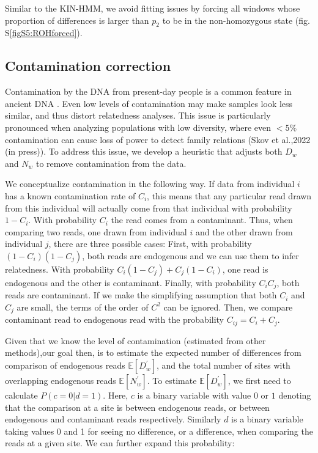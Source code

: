 \documentclass[12pt, letterpaper]{article}
\begin{document}
Similar to the KIN-HMM, we avoid fitting issues by forcing all windows whose proportion of differences is larger than $p_2$ to be in the non-homozygous state (fig. S\ref{figS5:ROHforced}).

\subsection{Contamination correction}\label{contam}
Contamination by the DNA from present-day people is a common feature in ancient DNA \cite{peyregne_present-day_2020}. Even low levels of contamination may make samples look less similar, and thus distort relatedness analyses. This issue is particularly pronounced  when analyzing populations with low diversity, where even $<5\%$ contamination can cause loss of power to detect family relations (Skov et al.,2022 (in press)). To address this issue, we develop a heuristic that adjusts both $D_w$ and $N_w$ to remove contamination from the data.

We conceptualize contamination in the following way. If data from individual $i$ has a known contamination rate of $C_i$, this means that any particular read drawn from this individual will actually come from that individual with probability $1-C_i$. With probability $C_i$ the read comes from a contaminant. Thus, when comparing two reads, one drawn from individual $i$ and the other drawn from individual $j$, there are three possible cases: First, with probability $(1-C_i)(1-C_j)$, both reads are endogenous and we can use them to infer relatedness. With probability $C_i(1-C_j) + C_j(1-C_i)$, one read is endogenous and the other is contaminant. Finally, with probability $C_iC_j$, both reads are contaminant. If we make the simplifying assumption that both $C_i$ and $C_j$ are small, the terms of the order of $C^2$ can be ignored. Then, we compare contaminant read to endogenous read with the probability $C_{ij} = C_i + C_j$.

Given that we know the level of contamination (estimated from other methods),our goal then, is to estimate the expected number of differences from comparison of endogenous reads $\mathbb{E}[D_w^{'}]$, and the total number of sites with overlapping endogenous reads $\mathbb{E}[N_w^{'}]$. To estimate $\mathbb{E}[D_w^{'}]$, we first need to calculate $P(c=0|d=1)$. Here, $c$ is a binary variable with value $0$ or $1$ denoting that the comparison at a site is between endogenous reads, or between endogenous and contaminant reads respectively. Similarly $d$ is a binary variable taking values 0 and 1 for seeing no difference, or a difference, when comparing the reads at a given site. We can further expand this probability:
\end{document}

